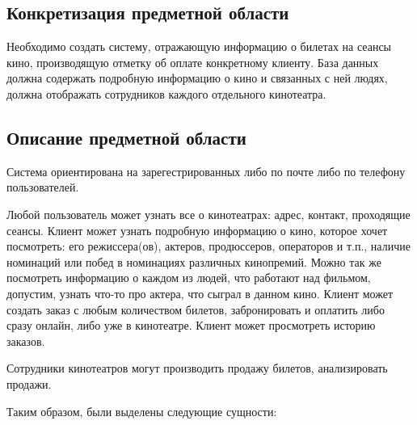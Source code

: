 \documentclass[a4paper,12pt]{article}
\renewcommand{\^}[2]{#1^{\, #2} \kern -1pt}
\newcommand{\1}{\kern 1pt}
\newcommand{\0}{\kern -1pt}
\begin{document}
	\newpage
	
	\subsection{Конкретизация предметной области}
	
	Необходимо создать систему, отражающую информацию о билетах на сеансы кино, производящую отметку об оплате конкретному клиенту. База данных должна содержать подробную информацию о кино и связанных с ней людях, должна отображать сотрудников каждого отдельного кинотеатра.
	
	
	\subsection{Описание предметной области}
	
	Система ориентирована на зарегестрированных либо по почте либо по телефону пользователей.
	
	Любой пользователь может узнать все о кинотеатрах: адрес, контакт, проходящие сеансы. Клиент может узнать подробную информацию о кино, которое хочет посмотреть: его режиссера(ов), актеров, продюссеров, операторов и т.п., наличие номинаций или побед в номинациях различных кинопремий. Можно так же посмотреть информацию о каждом из людей, что работают над фильмом, допустим, узнать что-то про актера, что сыграл в данном кино. Клиент может создать заказ с любым количеством билетов, забронировать и оплатить либо сразу онлайн, либо уже в кинотеатре.
	Клиент может просмотреть историю заказов.
	
	Сотрудники кинотеатров могут производить продажу билетов, анализировать продажи.
	
	Таким образом, были выделены следующие сущности:
	
\end{document}
